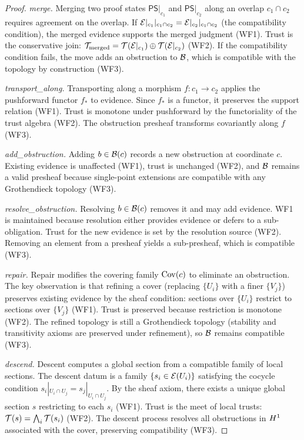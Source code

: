 \documentclass[11pt]{article}
\newcommand{\PS}{\mathsf{PS}}
\begin{document}
\begin{proof}
\emph{merge.}
Merging two proof states $\PS|_{c_1}$ and $\PS|_{c_2}$ along an
overlap $c_1 \cap c_2$ requires agreement on the overlap.  If
$\mathcal{E}|_{c_1}|_{c_1 \cap c_2} = \mathcal{E}|_{c_2}|_{c_1 \cap c_2}$
(the compatibility condition), the merged evidence supports the
merged judgment (WF1).  Trust is the conservative join:
$\mathcal{T}_{\mathrm{merged}} = \mathcal{T}(\mathcal{E}|_{c_1}) \oplus
\mathcal{T}(\mathcal{E}|_{c_2})$ (WF2).  If the compatibility condition fails,
the move adds an obstruction to $\mathcal{B}$, which is compatible
with the topology by construction (WF3).

\emph{transport\_along.}
Transporting along a morphism $f: c_1 \to c_2$ applies the
pushforward functor $f_*$ to evidence.  Since $f_*$ is a functor,
it preserves the support relation (WF1).  Trust is monotone
under pushforward by the functoriality of the trust algebra (WF2).
The obstruction presheaf transforms covariantly along $f$ (WF3).

\emph{add\_obstruction.}
Adding $b \in \mathcal{B}(c)$ records a new obstruction at coordinate $c$.
Existing evidence is unaffected (WF1), trust is unchanged (WF2),
and $\mathcal{B}$ remains a valid presheaf because single-point
extensions are compatible with any Grothendieck topology (WF3).

\emph{resolve\_obstruction.}
Resolving $b \in \mathcal{B}(c)$ removes it and may add evidence.
WF1 is maintained because resolution either provides evidence
or defers to a sub-obligation.  Trust for the new evidence
is set by the resolution source (WF2).  Removing an element
from a presheaf yields a sub-presheaf, which is compatible (WF3).

\emph{repair.}
Repair modifies the covering family $\mathrm{Cov}(c)$ to eliminate
an obstruction.  The key observation is that refining a cover
(replacing $\{U_i\}$ with a finer $\{V_j\}$) preserves existing
evidence by the sheaf condition: sections over $\{U_i\}$ restrict
to sections over $\{V_j\}$ (WF1).  Trust is preserved because
restriction is monotone (WF2).  The refined topology is still a
Grothendieck topology (stability and transitivity axioms are
preserved under refinement), so $\mathcal{B}$ remains compatible (WF3).

\emph{descend.}
Descent computes a global section from a compatible family of
local sections.  The descent datum is a family $\{s_i \in
\mathcal{E}(U_i)\}$ satisfying the cocycle condition $s_i|_{U_i \cap U_j}
= s_j|_{U_i \cap U_j}$.  By the sheaf axiom, there exists a unique
global section $s$ restricting to each $s_i$ (WF1).  Trust is the
meet of local trusts: $\mathcal{T}(s) = \bigwedge_i \mathcal{T}(s_i)$ (WF2).
The descent process resolves all obstructions in $H^{1}$
associated with the cover, preserving compatibility (WF3).
\end{proof}
\end{document}
